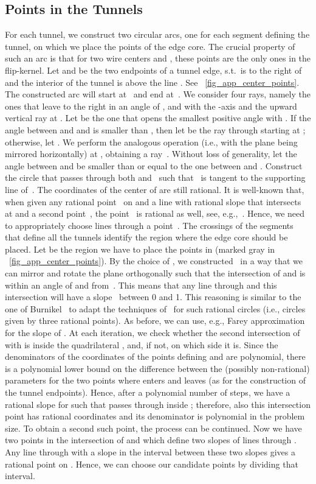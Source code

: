 \documentclass[11pt,a4paper]{article}
\begin{document}
\subsection{Points in the Tunnels}
For each tunnel, we construct two circular arcs, one for each segment defining the tunnel, on which we place the points of the edge core.
The crucial property of such an arc is that for two wire centers  and , these points are the only ones in the flip-kernel.
Let  and  be the two endpoints of a tunnel edge, s.t.\  is to the right of  and the interior of the tunnel is above the line .
See \figurename~\ref{fig_app_center_points}.
The constructed arc will start at~ and end at~.
We consider four rays, namely the ones that leave  to the right in an angle of , and  with the -axis and the upward vertical ray at .
Let  be the one that opens the smallest positive angle  with .
If the angle between  and  and  is smaller than , then let  be the ray through  starting at ; otherwise, let .
We perform the analogous operation (i.e., with the plane being mirrored horizontally) at , obtaining a ray~.
Without loss of generality, let the angle between  and  be smaller than or equal to the one between  and .
Construct the circle  that passes through both  and~ such that~ is tangent to the supporting line of~.
The coordinates of the center of  are still rational.
It is well-known that, when given any rational point~ on  and a line  with rational slope that intersects~ at  and a second point~, the point~ is rational as well, see, e.g.,~\cite[p.~5]{husemoeller}.
Hence, we need to appropriately choose lines through a point~.
The crossings of the segments that define all the tunnels identify the region where the edge core should be placed.
Let  be the region we have to place the points in (marked gray in \figurename~\ref{fig_app_center_points}).
By the choice of , we constructed~ in a way that we can mirror and rotate the plane orthogonally such that the intersection of  and  is within an angle of  and  from~.
This means that any line  through  and this intersection will have a slope~ between 0 and 1.
This reasoning is similar to the one of Burnikel~\cite{burnikel} to adapt the techniques of~\cite{canny} for such rational circles (i.e., circles given by three rational points).
As before, we can use, e.g., Farey approximation for the slope  of .
At each iteration, we check whether the second intersection of  with  is inside the quadrilateral , and, if not, on which side it is.
Since the denominators of the coordinates of the points defining  and  are polynomial, there is a polynomial lower bound on the difference between the (possibly non-rational) parameters for the two points where  enters and leaves  (as for the construction of the tunnel endpoints).
Hence, after a polynomial number of steps, we have a rational slope for  such that  passes through  inside ; therefore, also this intersection point has rational coordinates and its denominator is polynomial in the problem size.
To obtain a second such point, the process can be continued.
Now we have two points in the intersection of  and  which define two slopes of lines through .
Any line through  with a slope in the interval between these two slopes gives a rational point on .
Hence, we can choose our candidate points by dividing that interval.
\end{document}
